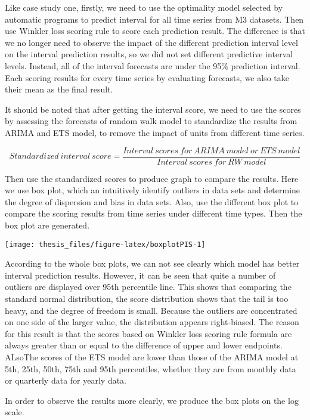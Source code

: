 \documentclass{monashthesis}
\theoremstyle{definition}
\theoremstyle{definition}
\theoremstyle{definition}
\theoremstyle{remark}
\begin{document}
Like case study one, firstly, we need to use the optimality model
selected by automatic programs to predict interval for all time series
from M3 datasets. Then use Winkler loss scoring rule to score each
prediction result. The difference is that we no longer need to observe
the impact of the different prediction interval level on the interval
prediction results, so we did not set different predictive interval
levels. Instead, all of the interval forecasts are under the 95\%
prediction interval. Each scoring results for every time series by
evaluating forecasts, we also take their mean as the final result.

It should be noted that after getting the interval score, we need to use
the scores by assessing the forecasts of random walk model to
standardize the results from ARIMA and ETS model, to remove the impact
of units from different time series.

\[Standardized~interval~score=\frac{Interval~scores~for~ARIMA~model~or~ETS~model}{Interval~scores~for~RW~model}\]

Then use the standardized scores to produce graph to compare the
results. Here we use box plot, which an intuitively identify outliers in
data sets and determine the degree of dispersion and bias in data sets.
Also, use the different box plot to compare the scoring results from
time series under different time types. Then the box plot are generated.

\texttt{[image: thesis\_files/figure-latex/boxplotPIS-1]}

According to the whole box plots, we can not see clearly which model has
better interval prediction results. However, it can be seen that quite a
number of outliers are displayed over 95th percentile line. This shows
that comparing the standard normal distribution, the score distribution
shows that the tail is too heavy, and the degree of freedom is small.
Because the outliers are concentrated on one side of the larger value,
the distribution appears right-biased. The reason for this result is
that the scores based on Winkler loss scoring rule formula are always
greater than or equal to the difference of upper and lower endpoints.
ALsoThe scores of the ETS model are lower than those of the ARIMA model
at 5th, 25th, 50th, 75th and 95th percentiles, whether they are from
monthly data or quarterly data for yearly data.

In order to observe the results more clearly, we produce the box plots
on the log scale.
\end{document}
